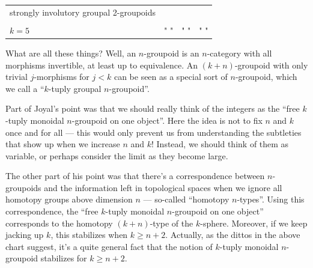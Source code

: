 \documentclass{article}
\begin{document}
\begin{longtable}[]{@{}llll@{}}
\begin{minipage}[t]{0.21\columnwidth}
strongly involutory groupal 2-groupoids\strut
\end{minipage}\tabularnewline
\begin{minipage}[t]{0.26\columnwidth}\raggedright
\strut
\end{minipage} & \begin{minipage}[t]{0.21\columnwidth}\raggedright
\strut
\end{minipage} & \begin{minipage}[t]{0.21\columnwidth}\raggedright
\strut
\end{minipage} & \begin{minipage}[t]{0.21\columnwidth}\raggedright
\strut
\end{minipage}\tabularnewline
\begin{minipage}[t]{0.26\columnwidth}\raggedright
\(k=5\)\strut
\end{minipage} & \begin{minipage}[t]{0.21\columnwidth}\raggedright
" "\strut
\end{minipage} & \begin{minipage}[t]{0.21\columnwidth}\raggedright
" "\strut
\end{minipage} & \begin{minipage}[t]{0.21\columnwidth}\raggedright
" "\strut
\end{minipage}\tabularnewline
\bottomrule
\end{longtable}

What are all these things? Well, an \(n\)-groupoid is an \(n\)-category
with all morphisms invertible, at least up to equivalence. An
\((k+n)\)-groupoid with only trivial \(j\)-morphisms for \(j < k\) can
be seen as a special sort of \(n\)-groupoid, which we call a
``\(k\)-tuply groupal \(n\)-groupoid''.

Part of Joyal's point was that we should really think of the integers as
the ``free \(k\)-tuply monoidal \(n\)-groupoid on one object''. Here the
idea is not to fix \(n\) and \(k\) once and for all --- this would only
prevent us from understanding the subtleties that show up when we
increase \(n\) and \(k\)! Instead, we should think of them as variable,
or perhaps consider the limit as they become large.

The other part of his point was that there's a correspondence between
\(n\)-groupoids and the information left in topological spaces when we
ignore all homotopy groups above dimension \(n\) --- so-called
``homotopy \(n\)-types''. Using this correspondence, the ``free
\(k\)-tuply monoidal \(n\)-groupoid on one object'' corresponds to the
homotopy \((k+n)\)-type of the \(k\)-sphere. Moreover, if we keep
jacking up \(k\), this stabilizes when \(k\geqslant n+2\). Actually, as
the dittos in the above chart suggest, it's a quite general fact that
the notion of \(k\)-tuply monoidal \(n\)-groupoid stabilizes for
\(k\geqslant n+2\).
\end{document}
